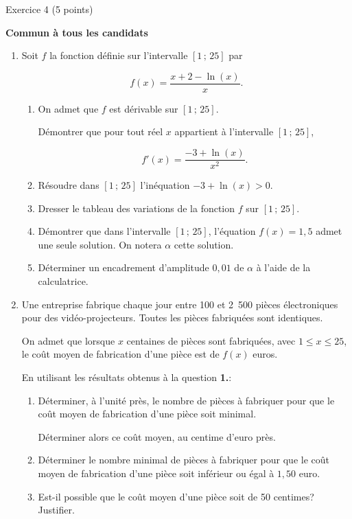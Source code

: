 
\begin{h2}Exercice 4 (5 points)\end{h2}
\textbf{Commun à tous les candidats}
\medskip
\begin{enumerate}
     \item Soit $f$ la fonction définie sur l'intervalle $[1\,;\,25]$ par
     \par
     \[f(x)=\dfrac{x+2-\ln(x)}{x}.\]
     \begin{enumerate}[label=\alph*.]
          \item  On admet que $f$ est dérivable sur $[1\,;\,25]$.
          \par
          Démontrer que pour tout réel $x$ appartient à l'intervalle $[1\,;\,25]$,
          \par
          \[f'(x)=\dfrac{-3+\ln(x)}{x^2}.\]
          \medskip
          \item Résoudre dans $[1\,;\,25]$ l'inéquation $-3+\ln(x)>0$.
          \item Dresser le tableau des variations de la fonction $f$ sur $[1\,;\,25]$.
          \item Démontrer que dans l'intervalle $[1\,;\,25]$, l'équation $f(x)=1,5$ admet une seule solution. On notera $\alpha$ cette solution.
          \item Déterminer un encadrement d'amplitude $0,01$ de $\alpha$ à l'aide de la calculatrice.
     \end{enumerate}
     \item Une entreprise fabrique chaque jour entre 100 et 2~500 pièces électroniques pour des vidéo-projecteurs. Toutes les pièces fabriquées sont identiques.
     \par
     On admet que lorsque $x$ centaines de pièces sont fabriquées, avec $1 \leqslant x \leqslant 25$, le coût moyen de fabrication d'une pièce est de $f(x)$ euros.
     \par
     En utilisant les résultats obtenus à la question \textbf{1.}:
     \begin{enumerate}[label=\alph*.]
          \item Déterminer, à l'unité près, le nombre de pièces à fabriquer pour que le coût moyen de fabrication d'une pièce soit minimal.
          \par
          Déterminer alors ce coût moyen, au centime d'euro près.
          \par
          \item Déterminer le nombre minimal de pièces à fabriquer pour que le coût moyen de fabrication d'une pièce soit inférieur ou égal à $1,50$ euro.
          \par
          \item Est-il possible que le coût moyen d'une pièce soit de 50 centimes? Justifier.
     \end{enumerate}
\end{enumerate}
